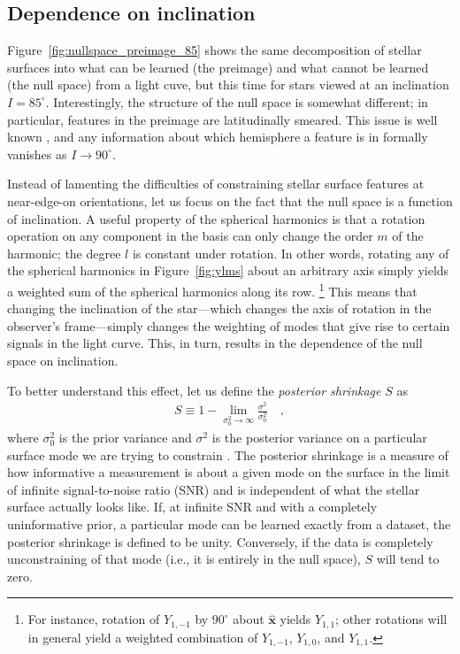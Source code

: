 \documentclass[modern]{aastex62}
\begin{document}
\subsection{Dependence on inclination}
\label{sec:inclination}

Figure~\ref{fig:nullspace_preimage_85} shows the same decomposition
of stellar surfaces into what can be learned (the preimage) and what
cannot be learned (the null space) from a light cuve, but this time
for stars viewed at an inclination $I = 85^\circ$. Interestingly,
the structure of the null space is somewhat different; in particular,
features in the preimage are latitudinally smeared. This
issue is well known \citep[e.g.,][]{Cowan2009,Basri2020}, and any
information about which hemisphere a feature is in formally vanishes
as $I \rightarrow 90^\circ$.

Instead of lamenting the difficulties of constraining stellar surface features
at near-edge-on orientations, let us focus on the fact that the
null space is a function of inclination.
%
A useful property of
the spherical harmonics is that a rotation operation on any
component in the basis can only change the order $m$ of the
harmonic; the degree $l$ is constant under rotation. In other
words, rotating any of the spherical harmonics in Figure~\ref{fig:ylms}
about an arbitrary axis simply yields a weighted sum of the spherical
harmonics along its row.%
\footnote{For instance, rotation of $Y_{1,-1}$ by $90^\circ$ about
    $\hat{\mathbf{x}}$ yields $Y_{1,1}$; other rotations will in general
    yield a weighted combination of $Y_{1,-1}$, $Y_{1,0}$, and $Y_{1,1}$.}
This means that changing the inclination of the star---which changes
the axis of rotation in the observer's frame---simply changes the weighting
of modes that give rise to certain signals in the light curve.
This, in turn, results in the dependence of the null space on inclination.

To better understand this effect, let us
define the \emph{posterior shrinkage} $S$ as
%
\begin{align}
    \label{eq:shrinkage}
    S \equiv 1 - \lim\limits_{\sigma_0^2 \rightarrow \infty}
    \frac{\sigma^2}{\sigma_0^2}
    \quad,
\end{align}
%
where $\sigma_0^2$ is the prior variance
and $\sigma^2$ is the posterior variance
on a particular surface mode we are trying to constrain
\citep[see, e.g.,][]{Betancourt2018}.
The posterior shrinkage is a measure of how informative a measurement is about a
given mode on the surface in the limit of infinite signal-to-noise ratio (SNR)
and is independent of what the stellar surface actually looks like.
If, at infinite SNR and with a completely uninformative prior,
a particular mode can be learned exactly from a dataset, the posterior
shrinkage is defined to be unity. Conversely, if the data is completely
unconstraining of that mode (i.e., it is entirely in the null space),
$S$ will tend to zero.
\end{document}
